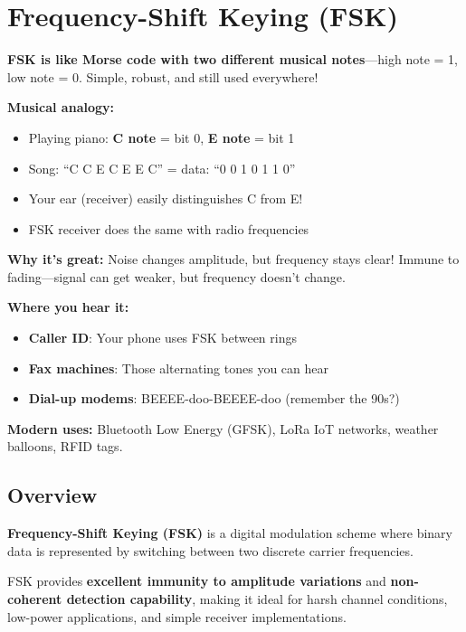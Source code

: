 \chapter{Frequency-Shift Keying (FSK)}
\label{ch:fsk}

\begin{nontechnical}
\textbf{FSK is like Morse code with two different musical notes}---high note = 1, low note = 0. Simple, robust, and still used everywhere!

\textbf{Musical analogy:}
\begin{itemize}
\item Playing piano: \textbf{C note} = bit 0, \textbf{E note} = bit 1
\item Song: ``C C E C E E C'' = data: ``0 0 1 0 1 1 0''
\item Your ear (receiver) easily distinguishes C from E!
\item FSK receiver does the same with radio frequencies
\end{itemize}

\textbf{Why it's great:} Noise changes amplitude, but frequency stays clear! Immune to fading---signal can get weaker, but frequency doesn't change.

\textbf{Where you hear it:}
\begin{itemize}
\item \textbf{Caller ID}: Your phone uses FSK between rings
\item \textbf{Fax machines}: Those alternating tones you can hear
\item \textbf{Dial-up modems}: BEEEE-doo-BEEEE-doo (remember the 90s?)
\end{itemize}

\textbf{Modern uses:} Bluetooth Low Energy (GFSK), LoRa IoT networks, weather balloons, RFID tags.
\end{nontechnical}

\section{Overview}

\textbf{Frequency-Shift Keying (FSK)} is a digital modulation scheme where binary data is represented by switching between two discrete carrier frequencies.

\begin{keyconcept}
FSK provides \textbf{excellent immunity to amplitude variations} and \textbf{non-coherent detection capability}, making it ideal for harsh channel conditions, low-power applications, and simple receiver implementations.
\end{keyconcept}

